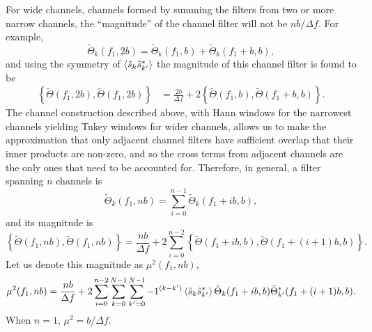\documentclass[10pt]{article}
\begin{document}
For wide channels, channels formed by summing the filters from two or more
narrow channels, the ``magnitude'' of the channel filter will not be \(n b
/ \Delta f\).  For example,
\begin{equation}
\tilde{\Theta}_{k}(f_{1}, 2 b)
   = \tilde{\Theta}_{k}(f_{1}, b) + \tilde{\Theta}_{k}(f_{1} + b, b),
\end{equation}
and using the symmetry of \(\left\langle\hat{s}_{k} \hat{s}^{*}_{k'}\right\rangle\) the
magnitude of this channel filter is found to be
\begin{align}
\left\{ \tilde{\Theta}(f_{1}, 2 b), \tilde{\Theta}(f_{1}, 2 b) \right\}
   & = \frac{2 b}{\Delta f} + 2 \left\{ \tilde{\Theta}(f_{1}, b),
   \tilde{\Theta}(f_{1} + b, b) \right\}.
\end{align}
The channel construction described above, with Hann windows for the
narrowest channels yielding Tukey windows for wider channels, allows us to
make the approximation that only adjacent channel filters have sufficient
overlap that their inner products are non-zero, and so the cross terms from
adjacent channels are the only ones that need to be accounted for.
Therefore, in general, a filter spanning \(n\) channels is
\begin{equation}
\tilde{\Theta}_{k}(f_{1}, n b)
   = \sum_{i = 0}^{n - 1} \tilde{\Theta}_{k}(f_{1} + i b, b),
\end{equation}
and its magnitude is
\begin{equation}
\left\{ \tilde{\Theta}(f_{1}, n b), \tilde{\Theta}(f_{1}, n b) \right\}
   = \frac{n b}{\Delta f} + 2 \sum_{i = 0}^{n - 2} \left\{
   \tilde{\Theta}(f_{1} + i b, b), \tilde{\Theta}(f_{1} + (i + 1) b, b)
   \right\}.
\end{equation}
Let us denote this magnitude as \(\mu^{2}(f_{1}, n b)\),
\begin{equation}
\label{eqn2}
\mu^{2}(f_{1}, n b)
   = \frac{n b}{\Delta f} + 2 \sum_{i = 0}^{n - 2} \sum_{k = 0}^{N - 1}
   \sum_{k' = 0}^{N - 1} -1^{(k - k')} \left\langle\hat{s}_{k}
   \hat{s}^{*}_{k'}\right\rangle \tilde{\Theta}_{k}(f_{1} + i b, b)
   \tilde{\Theta}^{*}_{k'}(f_{1} + (i + 1) b, b).
\end{equation}
When \(n = 1\), \(\mu^{2} = b / \Delta f\).
\end{document}
